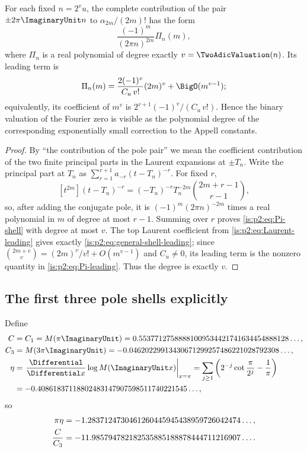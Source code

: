 \begin{corollary}
\label{is:p2:cor:pole-degree}
For each fixed $n=2^vu$, the complete contribution of the pair $\pm2\pi\ImaginaryUnit n$ to
$\alpha_{2m}/(2m)!$ has the form
\begin{equation}
 \frac{(-1)^m}{(2\pi n)^{2m}}\Pi_n(m),
 \label{is:p2:eq:Pi-shell}
\end{equation}
where $\Pi_n$ is a real polynomial of degree exactly
$v=\TwoAdicValuation(n)$.  Its leading term is
\begin{equation}
 \Pi_n(m)=\frac{2(-1)^{v}}{C_u\,v!}(2m)^v+\BigO(m^{v-1});
\label{is:p2:eq:Pi-leading}
\end{equation}
equivalently, its coefficient of $m^v$ is
$2^{v+1}(-1)^v/(C_u\,v!)$.
Hence the binary valuation of the Fourier zero is visible as the polynomial degree of the
corresponding exponentially small correction to the Appell constants.
\end{corollary}

\begin{proof}
By ``the contribution of the pole pair'' we mean the coefficient contribution
of the two finite principal parts in the Laurent expansions at $\pm T_n$.
Write the principal part at $T_n$ as
$\sum_{r=1}^{v+1}a_{-r}(t-T_n)^{-r}$.  For fixed $r$,
\[
 [t^{2m}](t-T_n)^{-r}
 =(-T_n)^{-r}T_n^{-2m}\binom{2m+r-1}{r-1},
\]
so, after adding the conjugate pole, it is
$(-1)^m(2\pi n)^{-2m}$ times a real polynomial in $m$ of degree at most
$r-1$.  Summing over $r$ proves \eqref{is:p2:eq:Pi-shell} with degree at most
$v$.  The top Laurent coefficient from
\eqref{is:p2:eq:Laurent-leading} gives exactly
\eqref{is:p2:eq:general-shell-leading}; since
$\binom{2m+v}{v}=(2m)^v/v!+O(m^{v-1})$ and $C_u\ne0$, its leading term is
the nonzero quantity in \eqref{is:p2:eq:Pi-leading}.  Thus the degree is
exactly $v$.
\end{proof}

\subsection{The first three pole shells explicitly}

Define
\begin{align}
 C&=C_1=M(\pi\ImaginaryUnit)
 =0.55377127588881009534421741634454888128\ldots,
 \label{is:p2:eq:C-value}\\
 C_3&=M(3\pi\ImaginaryUnit)
 =-0.04620229913430671299257486221028792308\ldots,
 \label{is:p2:eq:C3-value}\\
 \eta&=\left.\frac{\Differential}{\Differential x}\log M(\ImaginaryUnit x)\right|_{x=\pi}
 =\sum_{j\ge1}\left(2^{-j}\cot\frac{\pi}{2^j}-\frac1\pi\right)
 \notag\\
 &=-0.40861837118802483147907598511740221545\ldots,
 \label{is:p2:eq:eta-value}
\end{align}
so
\begin{align}
 \pi\eta
 &=-1.2837124730461260445945438959726042474\ldots,\notag\\
 \frac{C}{C_3}
 &=-11.985794782182535885188878444711216907\ldots.
 \label{is:p2:eq:eta-ratio-values}
\end{align}

